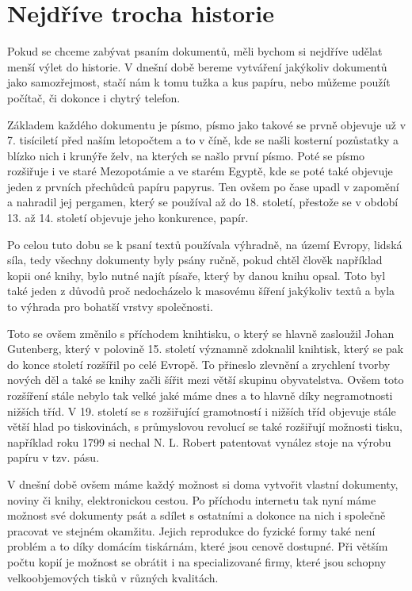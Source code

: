 \section{Nejdříve trocha historie}

Pokud se chceme zabývat psaním dokumentů, měli bychom si nejdříve udělat menší výlet do historie. V dnešní době bereme vytváření
jakýkoliv dokumentů jako samozřejmost, stačí nám k tomu tužka a kus papíru, nebo můžeme použít počítač, či dokonce i chytrý telefon.

Základem každého dokumentu je písmo, písmo jako takové se prvně objevuje už v 7. tisíciletí před naším letopočtem a to v číně,
kde se našli kosterní pozůstatky a blízko nich i krunýře želv, na kterých se našlo první písmo. \cite{EarliestWriting} Poté se písmo rozšiřuje
i ve staré Mezopotámie a ve starém Egyptě, kde se poté také objevuje jeden z prvních přechůdců papíru papyrus. Ten ovšem po čase upadl
v zapomění a nahradil jej pergamen, který se používal až do 18. století, přestože se v období 13. až 14. století objevuje jeho konkurence, papír.

Po celou tuto dobu se k psaní textů používala výhradně, na území Evropy, lidská síla, tedy všechny dokumenty byly psány ručně, pokud chtěl člověk například
kopii oné knihy, bylo nutné najít písaře, který by danou knihu opsal. Toto byl také jeden z důvodů proč nedocházelo k masovému šíření jakýkoliv textů a byla
to výhrada pro bohatší vrstvy společnosti.

Toto se ovšem změnilo s příchodem knihtisku, o který se hlavně zasloužil Johan Gutenberg, který v polovině 15. století významně zdoknalil knihtisk,
který se pak do konce století rozšířil po celé Evropě. To přineslo zlevnění a zrychlení tvorby nových děl a také se knihy začli šířit mezi větší skupinu
obyvatelstva. Ovšem toto rozšíření stále nebylo tak velké jaké máme dnes a to hlavně díky negramotnosti nižších tříd. V 19. století se s rozšiřující gramotností
i nižších tříd objevuje stále větší hlad po tiskovinách, s průmyslovou revolucí se také rozšiřují možnosti tisku, například roku 1799 si nechal N. L. Robert
patentovat vynález stoje na výrobu papíru v tzv.  pásu. \cite{Papir}

V dnešní době ovšem máme každý možnost si doma vytvořit vlastní dokumenty, noviny či knihy, elektronickou cestou. Po příchodu internetu tak nyní máme možnost
své dokumenty psát a sdílet s ostatními a dokonce na nich i společně pracovat ve stejném okamžitu. Jejich reprodukce do fyzické formy také není problém a to díky
domácím tiskárnám, které jsou cenově dostupné. Při větším počtu kopií je možnost se obrátit i na specializované firmy, které jsou schopny velkoobjemových tisků
v různých kvalitách.

